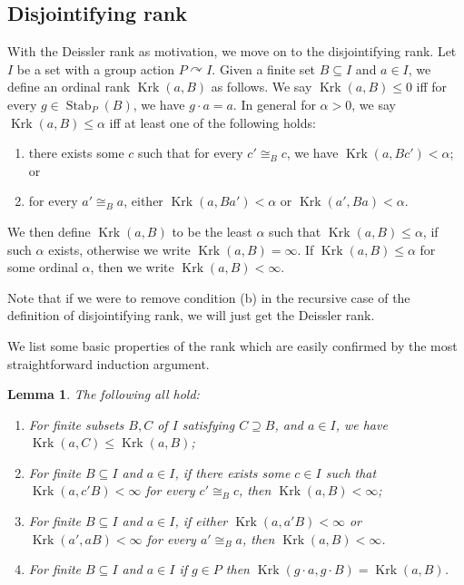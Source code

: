 \documentclass[12pt]{amsart}
\theoremstyle{plain}
\newtheorem{lemma}[theorem]{Lemma}
\theoremstyle{definition}
\newcommand{\isom}{\cong}
\DeclareMathOperator{\Stab}{Stab}
\DeclareMathOperator{\Krk}{Krk}
\begin{document}
\subsection{Disjointifying rank}
With the Deissler rank as motivation, we move on to the disjointifying rank.
Let $I$ be a set with a group action $P \curvearrowright I$.
Given a finite set $B \subseteq I$ and $a \in I$, we define an ordinal rank $\Krk(a, B)$ as follows.
We say $\Krk(a, B) \le 0$ iff for every $g \in \Stab_P(B)$, we have $g \cdot a = a$.
In general for $\alpha > 0$, we say $\Krk(a, B) \le \alpha$ iff at least one of the following holds:
\begin{enumerate}
\item[(a)] there exists some $c$ such that for every $c' \isom_B c$, we have $\Krk(a, Bc') < \alpha$;
or
\item[(b)] for every $a' \isom_B a$, either $\Krk(a, Ba') < \alpha$ or $\Krk(a', Ba) < \alpha$.
\end{enumerate}

We then define $\Krk(a, B)$ to be the least $\alpha$ such that $\Krk(a, B) \le \alpha$, if such $\alpha$ exists, otherwise we write $\Krk(a, B) = \infty$.
If $\Krk(a, B) \le \alpha$ for some ordinal $\alpha$, then we write $\Krk(a, B) < \infty$.

Note that if we were to remove condition (b) in the recursive case of the definition of disjointifying rank, we will just get the Deissler rank.

We list some basic properties of the rank which are easily confirmed by the most straightforward induction argument.
\begin{lemma}\label{lem:rank_basic_facts} The following all hold:
\begin{enumerate}
    \item[(1)]\label{item:knight_monotone} For finite subsets $B, C$ of $I$ satisfying $C \supseteq B$, and $a \in I$, we have $\Krk(a, C) \le \Krk(a, B)$;
    \item[(2a)]\label{item:knight2a} For finite $B \subseteq I$ and $a \in I$, if there exists some $c \in I$ such that $\Krk(a, c'B) < \infty$ for every $c' \isom_B c$, then $\Krk(a, B) < \infty$;
    \item[(2b)]\label{item:knight2b} For finite $B \subseteq I$ and $a \in I$, if either $\Krk(a, a'B) < \infty$ or $\Krk(a', aB) < \infty$ for every $a' \isom_B a$, then $\Krk(a, B) < \infty$.
    \item[(3)]\label{item:knight_invariant} For finite $B \subseteq I$ and $a \in I$ if $g \in P$ then $\Krk(g \cdot a, g \cdot B) = \Krk(a, B)$.
\end{enumerate}
\end{lemma}
\end{document}
